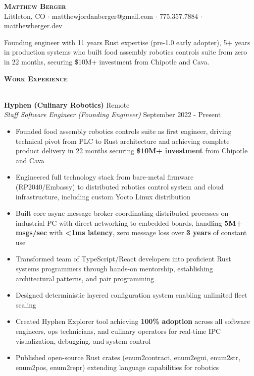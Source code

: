 \documentclass[a4paper]{article}
\newcommand{\lineunder} {
    \vspace*{-8pt} \\
    \hspace*{-18pt} \hrulefill \\
}
\newcommand{\header} [1] {
    {\hspace*{-18pt}\vspace*{6pt} \large \textbf{\textsc{#1}}}
    \vspace*{-6pt} \lineunder
    \vspace*{4pt}
}
\begin{document}
\vspace*{-40pt}

\begin{center}
    {\Huge \scshape \textbf{Matthew Berger}}\\
    \vspace*{4pt}
    Littleton, CO $\cdot$ matthewjordanberger@gmail.com $\cdot$ 775.357.7884 $\cdot$ matthewberger.dev\\
\end{center}

\vspace*{-6pt}
Founding engineer with 11 years Rust expertise (pre-1.0 early adopter), 5+ years in production systems who built food assembly robotics controls suite from zero in 22 months, securing \$10M+ investment from Chipotle and Cava.
\vspace*{8pt}

\header{Work Experience}

\textbf{Hyphen (Culinary Robotics)} \hfill Remote\\
\textit{Staff Software Engineer (Founding Engineer)} \hfill September 2022 - Present\\
\vspace{-1mm}
\begin{itemize} \itemsep 1pt
    \item Founded food assembly robotics controls suite as first engineer, driving technical pivot from PLC to Rust architecture and achieving complete product delivery in 22 months securing \textbf{\$10M+ investment} from Chipotle and Cava
    \item Engineered full technology stack from bare-metal firmware (RP2040/Embassy) to distributed robotics control system and cloud infrastructure, including custom Yocto Linux distribution
    \item Built core async message broker coordinating distributed processes on industrial PC with direct networking to embedded boards, handling \textbf{5M+ msgs/sec} with \textbf{<1ms latency}, zero message loss over \textbf{3 years} of constant use
    \item Transformed team of TypeScript/React developers into proficient Rust systems programmers through hands-on mentorship, establishing architectural patterns, and pair programming
    \item Designed deterministic layered configuration system enabling unlimited fleet scaling
    \item Created Hyphen Explorer tool achieving \textbf{100\% adoption} across all software engineers, ops technicians, and culinary operators for real-time IPC visualization, debugging, and system control
    \item Published open-source Rust crates (enum2contract, enum2egui, enum2str, enum2pos, enum2repr) extending language capabilities for robotics
\end{itemize}
\end{document}
